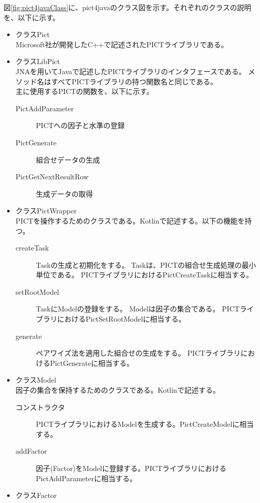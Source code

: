 \documentclass[uplatex, report, a4j, 10pt]{jsbook}
\begin{document}
図\ref{fig:pict4javaClass}に、pict4javaのクラス図を示す。それぞれのクラスの説明を、以下に示す。
\begin{itemize}
  \item クラスPict\\
        Microsoft社が開発したC++で記述されたPICTライブラリである。
  \item クラスLibPict\\
        JNAを用いてJavaで記述したPICTライブラリのインタフェースである。
        メソッド名はすべてPICTライブラリの持つ関数名と同じである。\\
        主に使用するPICTの関数を、以下に示す。
        \begin{description}
          \item[PictAddParameter] PICTへの因子と水準の登録
          \item[PictGenerate] 組合せデータの生成
          \item[PictGetNextResultRow] 生成データの取得
        \end{description}
  \item クラスPictWrapper\\
        PICTを操作するためのクラスである。Kotlin\cite{kotlin}で記述する。以下の機能を持つ。
        \begin{description}
          \item[createTask] Taskの生成と初期化をする。
                Taskは、PICTの組合せ生成処理の最小単位である。
                PICTライブラリにおけるPictCreateTaskに相当する。
          \item[setRootModel] TaskにModelの登録をする。
                Modelは因子の集合である。
                PICTライブラリにおけるPictSetRootModelに相当する。
          \item[generate] ペアワイズ法を適用した組合せの生成をする。
                PICTライブラリにおけるPictGenerateに相当する。
        \end{description}
  \item クラスModel\\
        因子の集合を保持するためのクラスである。Kotlinで記述する。
        \begin{description}
          \item[コンストラクタ] PICTライブラリにおけるModelを生成する。PictCreateModelに相当する。
          \item[addFactor] 因子(Factor)をModelに登録する。PICTライブラリにおけるPictAddParameterに相当する。
        \end{description}
  \item クラスFactor

\end{itemize}
\end{document}
